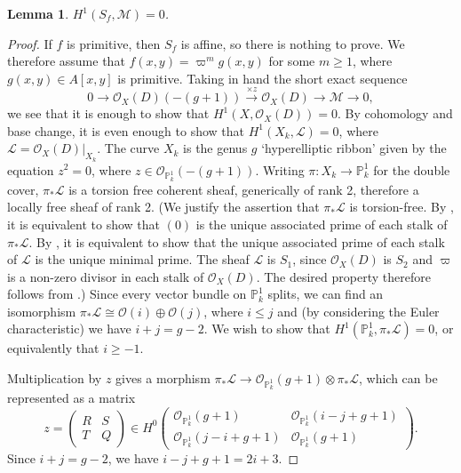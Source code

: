 \documentclass{article} %
\newtheorem{lemma}[proposition]{Lemma}
\numberwithin{equation}{section}
\renewcommand{\P}{\mathbb{P}}
\newcommand{\bbP}{\mathbb{P}}
\newcommand{\cO}{\mathcal{O}}
\begin{document}
\begin{lemma}\label{lem_vanishing_cohomology}
    $H^1(S_f, \mathcal{M}) = 0$.
\end{lemma}
\begin{proof}
    If $f$ is primitive, then $S_f$ is affine, so there is nothing to prove. We therefore assume that $f(x, y) = \varpi^m g(x, y)$ for some $m \geq 1$, where $g(x, y) \in A[x, y]$ is primitive. 
    Taking in hand the short exact sequence
    \[ 0 \to \cO_X(D)(-(g+1)) \overset{\times z}{\to} \cO_X(D) \to \mathcal{M} \to 0, \]
    we see that it is enough to show that $H^1(X, \cO_X(D)) = 0$. 
    By cohomology and base change, it is even enough to show that $H^1(X_k, \mathcal{L}) = 0$, where $\mathcal{L} = \cO_X(D)|_{X_k}$.
    The curve $X_k$ is the genus $g$ `hyperelliptic ribbon' \cite[\S1]{BayerEisenbud-ribbons} given by the equation $z^2 = 0$, where $z \in \cO_{\bbP_k^1}(-(g+1))$. Writing $\pi : X_k \to \bbP^1_k$ for the double cover, $\pi_\ast \mathcal{L}$ is a torsion free coherent sheaf, generically of rank 2, therefore a locally free sheaf of rank 2. (We justify the assertion that $\pi_\ast \mathcal{L}$ is torsion-free. By \cite[\href{https://stacks.math.columbia.edu/tag/0AUV}{Lemma 0AUV}]{stacks-project}, it is equivalent to show that $(0)$ is the unique associated prime of each stalk of $\pi_\ast \mathcal{L}$. By \cite[\href{https://stacks.math.columbia.edu/tag/05DZ}{Lemma 05DZ}]{stacks-project}, it is equivalent to show that the unique associated prime of each stalk of $\mathcal{L}$ is the unique minimal prime. The sheaf $\mathcal{L}$ is $S_1$, since $\cO_X(D)$ is $S_2$ and $\varpi$ is a non-zero divisor in each stalk of $\cO_X(D)$.
    The desired property therefore follows from \cite[\href{https://stacks.math.columbia.edu/tag/031Q}{Lemma 031Q}]{stacks-project}.) Since every vector bundle on $\bbP^1_k$ splits, we can find an isomorphism $\pi_\ast \mathcal{L} \cong \cO(i) \oplus \cO(j)$, where $i \leq j$ and (by considering the Euler characteristic) we have $i + j = g-2$. We wish to show that $H^1(\bbP^1_k, \pi_\ast \mathcal{L}) = 0$, or equivalently that $i \geq - 1$. 

    Multiplication by $z$ gives a morphism $\pi_\ast \mathcal{L} \to \cO_{\P^1_k}(g+1) \otimes \pi_\ast \mathcal{L}$, which can be represented as a matrix
    \[ z = \left( \begin{array}{cc} R & S \\ T & Q \end{array}\right) \in H^0\left( \begin{array}{cc} \cO_{\P^1_k}(g+1) & \cO_{\P^1_k}(i-j+g+1) \\ \cO_{\P^1_k}(j-i+g+1) & \cO_{\P^1_k}(g+1) \end{array}\right). \]
    Since $i + j = g-2$, we have $i-j+g+1 = 2i+3$. 


\end{proof}
\end{document}
